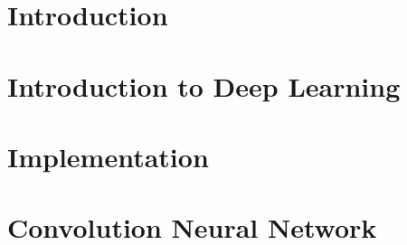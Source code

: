 \section[Intro]{Introduction}

 

 





\section[Intro]{Introduction to Deep Learning}



 

\section[Libs]{Implementation}




% 







\section[CNN]{Convolution Neural Network}



